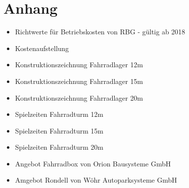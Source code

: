 \section{Anhang}

\begin{itemize}
  \item Richtwerte für Betriebskosten von RBG - gültig ab 2018
  \item Kostenaufstellung
  \item Konstruktionszeichnung Fahrradlager 12m
  \item Konstruktionszeichnung Fahrradlager 15m
  \item Konstruktionszeichnung Fahrradlager 20m
  \item Spielzeiten Fahrradturm 12m
  \item Spielzeiten Fahrradturm 15m
  \item Spielzeiten Fahrradturm 20m
  \item Angebot Fahrradbox von Orion Bausysteme GmbH
  \item Amgebot Rondell von Wöhr Autoparksysteme GmbH
\end{itemize}

% 










